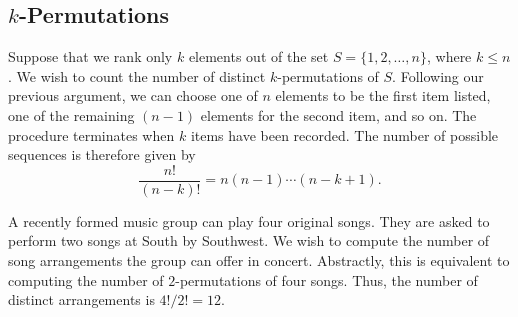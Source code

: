 \subsection{$k$-Permutations}

Suppose that we rank only $k$ elements out of the set $S = \{ 1, 2, \ldots, n \}$, where $k \leq n$.
We wish to count the number of distinct $k$-permutations of $S$.
Following our previous argument, we can choose one of $n$ elements to be the first item listed, one of the remaining $(n-1)$ elements for the second item, and so on.
The procedure terminates when $k$ items have been recorded.
The number of possible sequences is therefore given by
\begin{equation*}
\frac{n!}{(n-k)!} = n (n-1) \cdots (n-k+1) .
\end{equation*}

\begin{example}
A recently formed music group can play four original songs.
They are asked to perform two songs at South by Southwest.
We wish to compute the number of song arrangements the group can offer in concert.
Abstractly, this is equivalent to computing the number of $2$-permutations of four songs.
Thus, the number of distinct arrangements is ${4!}/{2!} = 12$.
\end{example}

